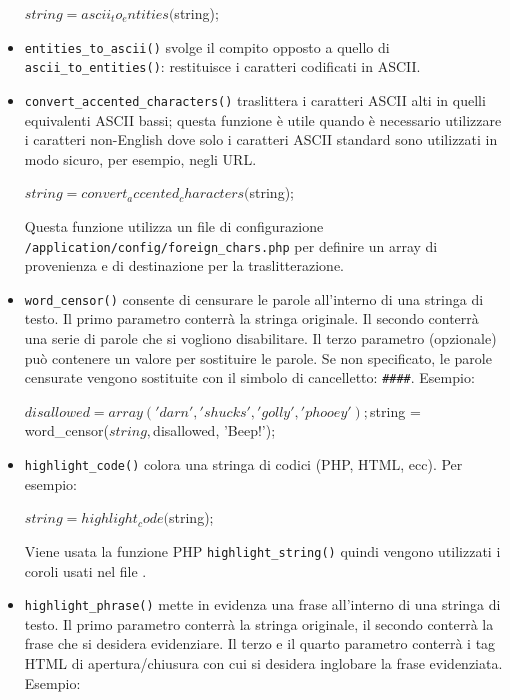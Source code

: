 \begin{itemize}
\begin{code}
$string = ascii_to_entities($string);
\end{code}

\item \verb|entities_to_ascii()| svolge il compito opposto a quello di \verb|ascii_to_entities()|: restituisce i caratteri codificati in ASCII.

\item \verb|convert_accented_characters()| traslittera i caratteri ASCII alti in quelli equivalenti ASCII bassi; questa funzione è utile quando è necessario utilizzare i caratteri non-English dove solo i caratteri ASCII standard sono utilizzati in modo sicuro, per esempio, negli \ac{URL}.

\begin{code}
$string = convert_accented_characters($string);
\end{code}

Questa funzione utilizza un file di configurazione \verb|/application/config/foreign_chars.php| per definire un array di provenienza e di destinazione per la traslitterazione.

\item \verb|word_censor()| consente di censurare le parole all'interno di una stringa di testo. Il primo parametro conterrà la stringa originale. Il secondo conterrà una serie di parole che si vogliono disabilitare. Il terzo parametro (opzionale) può contenere un valore per sostituire le parole. Se non specificato, le parole censurate vengono sostituite con il simbolo di cancelletto: \verb|####|. Esempio:

\begin{code}
$disallowed = array('darn', 'shucks', 'golly', 'phooey');

$string = word_censor($string, $disallowed, 'Beep!');
\end{code}

\item \verb|highlight_code()| colora una stringa di codici (PHP, HTML, ecc). Per esempio:

\begin{code}
$string = highlight_code($string);
\end{code}

Viene usata la funzione PHP \verb|highlight_string()| quindi vengono utilizzati i coroli usati nel file .

\item \verb|highlight_phrase()| mette in evidenza una frase all'interno di una stringa di testo. Il primo parametro conterrà la stringa originale, il secondo conterrà la frase che si desidera evidenziare. Il terzo e il quarto parametro conterrà i tag \ac{HTML} di apertura/chiusura con cui si desidera inglobare la frase evidenziata. Esempio:


\end{itemize}
